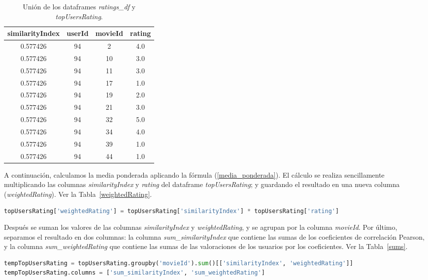 \documentclass{uimppracticas}
\begin{document}
\begin{table}[H]
	\centering
	\begin{tabular}{cccc}
		\toprule
		similarityIndex &  userId &  movieId &  rating \\
		\midrule
		0.577426 &      94 &        2 &     4.0 \\
		0.577426 &      94 &       10 &     3.0 \\
		0.577426 &      94 &       11 &     3.0 \\
		0.577426 &      94 &       17 &     1.0 \\
		0.577426 &      94 &       19 &     2.0 \\
		0.577426 &      94 &       21 &     3.0 \\
		0.577426 &      94 &       32 &     5.0 \\
		0.577426 &      94 &       34 &     4.0 \\
		0.577426 &      94 &       39 &     1.0 \\
		0.577426 &      94 &       44 &     1.0 \\
		\bottomrule
	\end{tabular}
	\caption{Unión de los dataframes \textit{ratings\_df} y \textit{topUsersRating}.}
	\label{ratings_similares}
\end{table}

A continuación, calculamos la media ponderada aplicando la fórmula (\ref{media_ponderada}). El cálculo se realiza sencillamente multiplicando las columnas \textit{similarityIndex} y \textit{rating} del dataframe \textit{topUsersRating}; y guardando el resultado en una nueva columna (\textit{weightedRating}). Ver la Tabla~\ref{weightedRating}.

\begin{lstlisting}[language=python, basicstyle=\small]
topUsersRating['weightedRating'] = topUsersRating['similarityIndex'] * topUsersRating['rating']
\end{lstlisting} 

Después se suman los valores de las columnas \textit{similarityIndex} y \textit{weightedRating}, y se agrupan por la columna \textit{movieId}. Por último, separamos el resultado en dos columnas: la columna \textit{sum\_similarityIndex} que contiene las sumas de los coeficientes de correlación Pearson, y la columna \textit{sum\_weightedRating} que contiene las sumas de las valoraciones de los usuarios por los coeficientes. Ver la Tabla~\ref{sums}.

\begin{lstlisting}[language=python, basicstyle=\small]
tempTopUsersRating = topUsersRating.groupby('movieId').sum()[['similarityIndex', 'weightedRating']]
tempTopUsersRating.columns = ['sum_similarityIndex', 'sum_weightedRating']
\end{lstlisting} 
\end{document}
